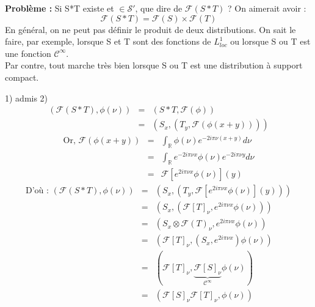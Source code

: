 \documentclass{article}
\begin{document}
\textbf{Problème :} Si S*T existe et $\in\mathcal{S}'$, que dire de $\mathcal{F}(S*T)$ ? On aimerait avoir : 
\[\mathcal{F}(S*T)=\mathcal{F}(S)\times\mathcal{F}(T)\]
En général, on ne peut pas définir le produit de deux distributions. On sait le faire, par exemple, lorsque S et T sont des fonctions de $L^1_{loc}$ ou lorsque S ou T est une fonction $\mathcal{C}^{\infty}$. \\
Par contre, tout marche très bien lorsque S ou T est une distribution à support compact.



\begin{dem}
1) admis
2) \begin{eqnarray*}
(\mathcal{F}(S*T),\phi(\nu))&=&(S*T,\mathcal{F}(\phi)) \\
			&=& (S_x,(T_y,\mathcal{F}(\phi(x+y))))
\end{eqnarray*}
\begin{eqnarray*}
\text{Or, } \mathcal{F}(\phi(x+y))&=& \int_{\mathbb{R}} \phi(\nu) e^{-2i\pi\nu(x+y)} d\nu \\
				&=& \int_{\mathbb{R}} e^{-2i\pi\nu x} \phi(\nu) e^{-2i\pi\nu y} d\nu \\
				&=& \mathcal{F}\left[e^{2i\pi\nu x} \phi(\nu)  \right] (y)
\end{eqnarray*}
\begin{eqnarray*}
\text{D'où : } (\mathcal{F}(S*T),\phi(\nu))&=&(S_x,(T_y,\mathcal{F}\left[e^{2i\pi\nu x} \phi(\nu)  \right] (y))) \\
					&=& (S_x,(\mathcal{F}[T]_{\nu},e^{2i\pi\nu x} \phi(\nu))) \\
					&=& (S_x \otimes \mathcal{F}(T)_{\nu},e^{2i\pi\nu x} \phi(\nu) ) \\
					&=& (\mathcal{F}[T]_{\nu},(S_x,e^{2i\pi\nu x}) \phi(\nu) ) \\
					&=& (\mathcal{F}[T]_{\nu},\underbrace{\mathcal{F}[S]_{\nu}}_{\mathcal{C}^{\infty}} \phi(\nu)) \\ 
					&=& (\mathcal{F}[S]_{\nu} \mathcal{F}[T]_{\nu},\phi(\nu))
\end{eqnarray*}
\end{dem}
\end{document}
